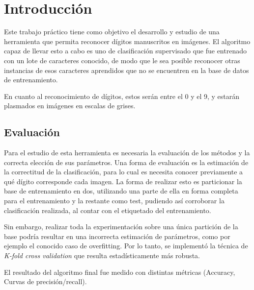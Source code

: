 \section{Introducción}

Este trabajo práctico tiene como objetivo el desarrollo y estudio de una herramienta que permita reconocer dígitos manuscritos en imágenes. El algoritmo capaz de llevar esto a cabo es uno de clasificación supervisado que fue entrenado con un lote de caracteres conocido, de modo que le sea posible reconocer otras instancias de esos caracteres aprendidos que no se encuentren en la base de datos de entrenamiento.

En cuanto al reconocimiento de dígitos, estos serán entre el 0 y el 9, y estarán plasmados en imágenes en escalas de grises.

\subsection{Evaluación}

Para el estudio de esta herramienta es necesaria la evaluación de los métodos y la correcta elección de sus parámetros. Una forma de evaluación es la estimación de la correctitud de la clasificación, para lo cual es necesita conocer previamente a qué dígito corresponde cada imagen. La forma de realizar esto es particionar la base de entrenamiento en dos, utilizando una parte de ella en forma completa para el entrenamiento y la restante como test, pudiendo así corroborar la clasificación realizada, al contar con el etiquetado del entrenamiento.

Sin embargo, realizar toda la experimentación sobre una única partición de la base podría resultar en una incorrecta estimación de parámetros, como por ejemplo el conocido caso de overfitting. Por lo tanto, se implementó la técnica de \textit{K-fold cross validation} que resulta estadísticamente más robusta.

El resultado del algoritmo final fue medido con distintas métricas (Accuracy, Curvas de precisión/recall).
